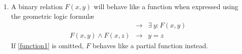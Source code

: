 \begin{enumerate}

			\item
			A binary relation $F(x,y)$ will behave like a function when
			expressed using the geometric logic formul{\ae}
			\begin{eqnarray}
			\label{function1}
				{}                   & \to & \exists\ y : F(x,y)  \\
			\label{function2}
				F(x,y) \wedge F(x,z) & \to & y = z
			\end{eqnarray}
			If \eqref{function1} is omitted, $F$ behaves like a partial
			function instead.
			\end{enumerate}
